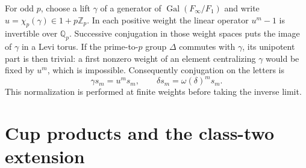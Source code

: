 \documentclass[11pt]{article}
\theoremstyle{definition}
\numberwithin{equation}{section}
\begin{document}
For odd $p$, choose a lift $\gamma$ of a generator of
$\operatorname{Gal}(F_\infty/F_1)$ and write
$u=\chi_p(\gamma)\in1+p\mathbb Z_p$. In each positive weight the
linear operator $u^m-1$ is invertible over $\mathbb Q_p$. Successive
conjugation in those weight spaces puts the image of $\gamma$ in
a Levi torus. If the prime-to-$p$ group $\Delta$ commutes with
$\gamma$, its unipotent part is then trivial: a first nonzero weight
of an element centralizing $\gamma$ would be fixed by $u^m$, which
is impossible. Consequently conjugation on the letters is
\begin{equation}
 \gamma s_m=u^m s_m,\qquad
 \delta s_m=\omega(\delta)^m s_m.
\end{equation}
This normalization is performed at finite
weights before taking the inverse limit.

\section{Cup products and the class-two extension}
\end{document}
